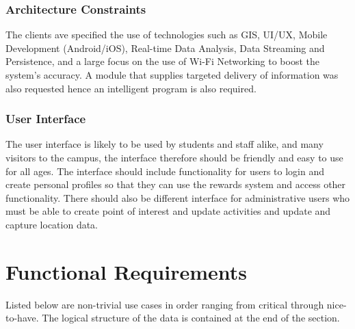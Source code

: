 \documentclass[11pt,a4paper]{report}
\begin{document}
			\subsubsection{Architecture Constraints}
				The clients ave specified the use of technologies such as GIS, UI/UX, Mobile Development (Android/iOS),  Real-time Data Analysis, Data Streaming and
				Persistence, and a large focus on the use of Wi-Fi Networking to boost the system's accuracy. A module that supplies targeted delivery of information was also requested hence an intelligent program is also required.
				
			\subsubsection{User Interface}
				The user interface is likely to be used by students and staff alike, and many visitors to the campus, the interface therefore should be friendly and easy to use for all ages. The interface should include functionality for users to login and create personal profiles
				so that they can use the rewards system and access other functionality. There should also be different interface for administrative users who must be able to create point of interest and update activities and update and capture location data.
	\newpage	
	\section{Functional Requirements}
		Listed below are non-trivial use cases in order ranging from critical through nice-to-have. The logical structure of the data is contained at the end of the section.
		
			
\end{document}

